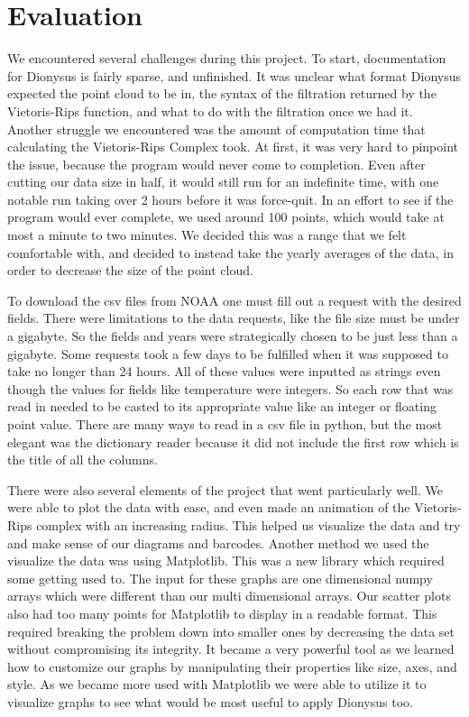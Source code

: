 \documentclass[12pt]{report}
\begin{document}
\section*{Evaluation}
We encountered several challenges during this project. To start, documentation for Dionysus is fairly sparse, and unfinished. It was unclear what format Dionysus expected the point cloud to be in, the syntax of the filtration returned by the Vietoris-Rips function, and what to do with the filtration once we had it. Another struggle we encountered was the amount of computation time that calculating the Vietoris-Rips Complex took. At first, it was very hard to pinpoint the issue, because the program would never come to completion. Even after cutting our data size in half, it would still run for an indefinite time, with one notable run taking over 2 hours before it was force-quit. In an effort to see if the program would ever complete, we used around 100 points, which would take at most a minute to two minutes. We decided this was a range that we felt comfortable with, and decided to instead take the yearly averages of the data, in order to decrease the size of the point cloud.\par 
To download the csv files from NOAA one must fill out a request with the desired fields. There were limitations to the data requests, like the file size must be under a gigabyte. So the fields and years were strategically chosen to be just less than a gigabyte. Some requests took a few days to be fulfilled when it was supposed to take no longer than 24 hours. All of these values were inputted as strings even though the values for fields like temperature were integers. So each row that was read in needed to be casted to its appropriate value like an integer or floating point value. There are many ways to read in a csv file in python, but the most elegant was the dictionary reader because it did not include the first row which is the title of all the columns.\par
 There were also several elements of the project that went particularly well. We were able to plot the data with ease, and even made an animation of the Vietoris-Rips complex with an increasing radius. This helped us visualize the data and try and make sense of our diagrams and barcodes. Another method we used the visualize the data was using Matplotlib. This was a new library which required some getting used to. The input for these graphs are one dimensional numpy arrays which were different than our multi dimensional arrays. Our scatter plots also had too many points for Matplotlib to display in a readable format. This required breaking the problem down into smaller ones by decreasing the data set without compromising its integrity. It became a very powerful tool as we learned how to customize our graphs by manipulating their properties like size, axes, and style. As we became more used with Matplotlib we were able to utilize it to visualize graphs to see what would be most useful to apply Dionysus too. \par
\end{document}
